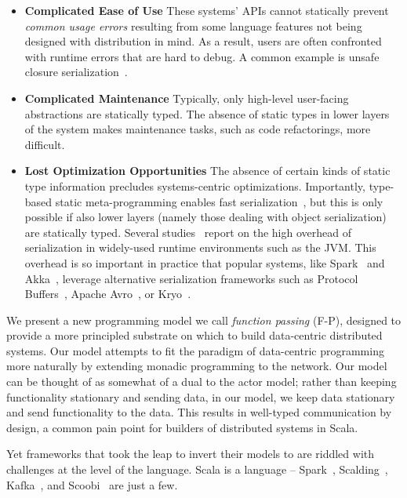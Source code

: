 \documentclass[preprint]{sigplanconf}
\theoremstyle{definition}
\theoremstyle{definition}
\begin{document}
\begin{itemize}

\item {\bf Complicated Ease of Use} These systems' APIs cannot statically
prevent {\em common usage errors} resulting from some language features not
being designed with distribution in mind. As a result, users are often
confronted with runtime errors that are hard to debug. A common example is
unsafe closure serialization~\cite{Spores}.

\item {\bf Complicated Maintenance} Typically, only high-level user-facing abstractions are statically
typed.  The absence of static types in lower layers of the system makes
maintenance tasks, such as code refactorings, more difficult.

\item {\bf Lost Optimization Opportunities} The absence of certain kinds of
static type information precludes systems-centric optimizations. Importantly,
type-based static meta-programming enables fast serialization~\cite{Pickling},
but this is only possible if also lower layers (namely those dealing with
object serialization) are statically typed. Several
studies~\cite{JavaSerialization, JavaRMI, MoreEfficientJavaRMI, Jaguar} report
on the high overhead of serialization in widely-used runtime environments such
as the JVM. This overhead is so important in practice that popular systems,
like Spark~\cite{Spark} and Akka~\cite{Akka}, leverage alternative
serialization frameworks such as Protocol Buffers~\cite{Protobuf}, Apache
Avro~\cite{Avro}, or Kryo~\cite{Kryo}. \end{itemize}


We present a new programming model we call {\em function passing} (F-P),
designed to provide a more principled substrate on which to build data-centric
distributed systems. Our model attempts to fit the paradigm of data-centric
programming more naturally by extending monadic programming to the network.
Our model can be thought of as somewhat of a dual to the actor model; rather
than keeping functionality stationary and sending data, in our model, we keep
data stationary and send functionality to the data. This results in well-typed
communication by design, a common pain point for builders of distributed
systems in Scala.


Yet frameworks that took the leap to invert their models to  are riddled with
challenges at the level of the language. Scala is a language --
Spark~\cite{Spark}, Scalding~\cite{Scalding}, Kafka~\cite{Kafka}, and
Scoobi~\cite{Scoobi} are just a few.
\end{document}
